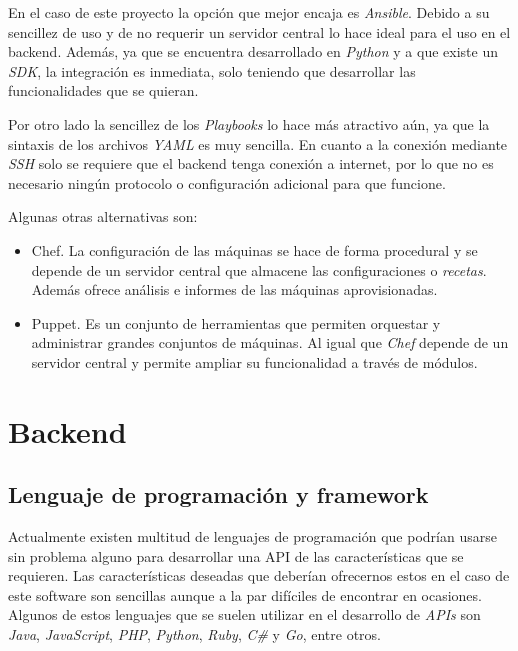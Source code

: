 En el caso de este proyecto la opción que mejor encaja es \textit{Ansible}. Debido a su sencillez de uso y de no requerir un servidor central lo hace ideal para el uso en el backend. Además, ya que se encuentra desarrollado en \textit{Python} y a que existe un \textit{SDK}, la integración es inmediata, solo teniendo que desarrollar las funcionalidades que se quieran.

Por otro lado la sencillez de los \textit{Playbooks} lo hace más atractivo aún, ya que la sintaxis de los archivos \textit{YAML}  es muy sencilla. En cuanto a la conexión mediante \textit{SSH} solo se requiere que el backend tenga conexión a internet, por lo que no es necesario ningún protocolo o configuración adicional para que funcione.

\bigskip
Algunas otras alternativas son:
\begin{itemize}
	\item Chef. La configuración de las máquinas se hace de forma procedural y se depende de un servidor central que almacene las configuraciones o \textit{recetas}. Además ofrece análisis e informes de las máquinas aprovisionadas.
	\item Puppet. Es un conjunto de herramientas que permiten orquestar y administrar grandes conjuntos de máquinas. Al igual que \textit{Chef} depende de un servidor central y permite ampliar su funcionalidad a través de módulos.
\end{itemize}



\section{Backend}

\subsection{Lenguaje de programación y framework}

Actualmente existen multitud de lenguajes de programación que podrían usarse sin problema alguno para desarrollar una API de las características que se requieren. Las características deseadas que deberían ofrecernos estos en el caso de este software son sencillas aunque a la par difíciles de encontrar en ocasiones. Algunos de estos lenguajes que se suelen utilizar en el desarrollo de \textit{APIs} son \textit{Java}, \textit{JavaScript}, \textit{PHP}, \textit{Python}, \textit{Ruby}, \textit{C\#} y \textit{Go}, entre otros.


